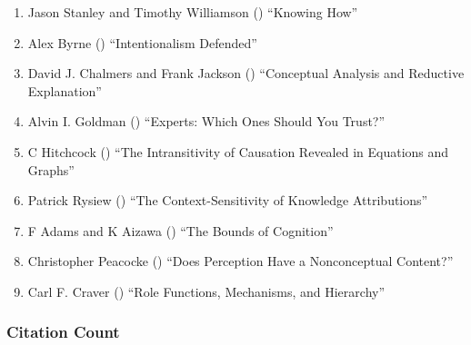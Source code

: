 \documentclass[
  10pt,
  letterpaper,
  DIV=11,
  numbers=noendperiod,
  twoside]{scrartcl}
\providecommand{\tightlist}{%
  \setlength{\itemsep}{0pt}\setlength{\parskip}{0pt}}\usepackage{longtable,booktabs,array}
\begin{document}
\begin{enumerate}
\def\labelenumi{\arabic{enumi}.}
\tightlist
\item
  Jason Stanley and Timothy Williamson
  () ``Knowing How''
\item
  Alex Byrne () ``Intentionalism
  Defended''
\item
  David J. Chalmers and Frank Jackson
  () ``Conceptual Analysis and
  Reductive Explanation''
\item
  Alvin I. Goldman () ``Experts:
  Which Ones Should You Trust?''
\item
  C Hitchcock () ``The
  Intransitivity of Causation Revealed in Equations and Graphs''
\item
  Patrick Rysiew () ``The
  Context-Sensitivity of Knowledge Attributions''
\item
  F Adams and K Aizawa () ``The
  Bounds of Cognition''
\item
  Christopher Peacocke () ``Does
  Perception Have a Nonconceptual Content?''
\item
  Carl F. Craver () ``Role
  Functions, Mechanisms, and Hierarchy''
\end{enumerate}

\subsubsection*{Citation Count}\label{sec-count-2001}
\end{document}
